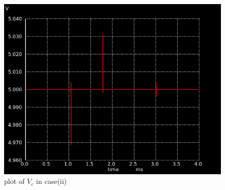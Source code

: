 \documentclass[journal,12pt,twocolumn]{IEEEtran}
\begin{document}
\begin{figure}[ht]
    \centering
    \includegraphics[width=1\columnwidth]{figs/fig2.png}
    \caption{plot of $V_c$ in case(ii)}
    \label{fig:fig2.gate.ee.23.54}
\end{figure}
\end{document}
